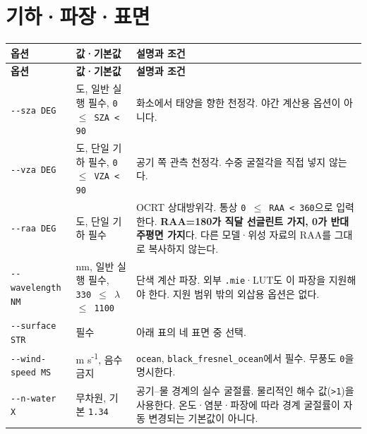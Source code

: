 \section{기하·파장·표면}
\label{sec:auto:03_options:2}



{\TableFont
\begin{longtable}{@{}>{\raggedright\arraybackslash}p{}>{\raggedright\arraybackslash}p{}>{\raggedright\arraybackslash}p{}@{}}
\toprule
\textbf{옵션} & \textbf{값·기본값} & \textbf{설명과 조건} \\
\midrule
\endfirsthead
\toprule
\textbf{옵션} & \textbf{값·기본값} & \textbf{설명과 조건} \\
\midrule
\endhead
\bottomrule
\endfoot
\texttt{-\allowbreak{}-\allowbreak{}sza DEG} & 도, 일반 실행 필수, \texttt{0 \ensuremath{\leq} SZA < 90} & 화소에서 태양을 향한 천정각. 야간 계산용 옵션이 아니다. \\
\texttt{-\allowbreak{}-\allowbreak{}vza DEG} & 도, 단일 기하 필수, \texttt{0 \ensuremath{\leq} VZA < 90} & 공기 쪽 관측 천정각. 수중 굴절각을 직접 넣지 않는다. \\
\texttt{-\allowbreak{}-\allowbreak{}raa DEG} & 도, 단일 기하 필수 & OCRT 상대방위각. 통상 \texttt{0 \ensuremath{\leq} RAA < 360}으로 입력한다. \textbf{RAA=180\textdegree{}가 직달 선글린트 가지, 0\textdegree{}가 반대 주평면 가지}다. 다른 모델·위성 자료의 RAA를 그대로 복사하지 않는다. \\
\texttt{-\allowbreak{}-\allowbreak{}wavelength NM} & nm, 일반 실행 필수, \texttt{330 \ensuremath{\leq} \ensuremath{\lambda} \ensuremath{\leq} 1100} & 단색 계산 파장. 외부 \texttt{.\allowbreak{}mie}·LUT도 이 파장을 지원해야 한다. 지원 범위 밖의 외삽용 옵션은 없다. \\
\texttt{-\allowbreak{}-\allowbreak{}surface STR} & 필수 & 아래 표의 네 표면 중 선택. \\
\texttt{-\allowbreak{}-\allowbreak{}wind-\allowbreak{}speed MS} & m s\textsuperscript{-}\textsuperscript{1}, 음수 금지 & \texttt{ocean}, \texttt{black\_\allowbreak{}fresnel\_\allowbreak{}ocean}에서 필수. 무풍도 \texttt{0}을 명시한다. \\
\texttt{-\allowbreak{}-\allowbreak{}n-\allowbreak{}water X} & 무차원, 기본 \texttt{1.\allowbreak{}34} & 공기--물 경계의 실수 굴절률. 물리적인 해수 값(\texttt{>1})을 사용한다. 온도·염분·파장에 따라 경계 굴절률이 자동 변경되는 기본값이 아니다. \\

\end{longtable}}
